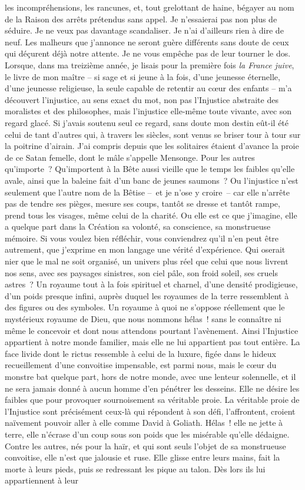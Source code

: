 \documentclass[french,twoside]{book} %
\begin{document}
les incompréhensions, les rancunes, et, tout grelottant de haine, bégayer au nom de la Raison des arrêts prétendus sans appel. Je n’essaierai pas non plus de séduire. Je ne veux pas davantage scandaliser. Je n’ai d’ailleurs rien à dire de neuf. Les malheurs que j’annonce ne seront guère différents sans doute de ceux qui déçurent déjà notre attente. Je ne vous empêche pas de leur tourner le dos. Lorsque, dans ma treizième année, je lisais pour la première fois \emph{la France juive}, le livre de mon maître – si sage et si jeune à la fois, d’une jeunesse éternelle, d’une jeunesse religieuse, la seule capable de retentir au cœur des enfants – m’a découvert l’injustice, au sens exact du mot, non pas l’Injustice abstraite des moralistes et des philosophes, mais l’injustice elle-même toute vivante, avec son regard glacé. Si j’avais soutenu seul ce regard, sans doute mon destin eût-il été celui de tant d’autres qui, à travers les siècles, sont venus se briser tour à tour sur la poitrine d’airain. J’ai compris depuis que les solitaires étaient d’avance la proie de ce Satan femelle, dont le mâle s’appelle Mensonge. Pour les autres qu’importe ? Qu’importent à la Bête aussi vieille que le temps les faibles qu’elle avale, ainsi que la baleine fait d’un banc de jeunes saumons ? Ou l’injustice n’est seulement que l’autre nom de la Bêtise – et je n’ose y croire – car elle n’arrête pas de tendre ses pièges, mesure ses coups, tantôt se dresse et tantôt rampe, prend tous les visages, même celui de la charité. Ou elle est ce que j’imagine, elle a quelque part dans la Création sa volonté, sa conscience, sa monstrueuse mémoire. Si vous voulez bien réfléchir, vous conviendrez qu’il n’en peut être autrement, que j’exprime en mon langage une vérité d’expérience. Qui oserait nier que le mal ne soit organisé, un univers plus réel que celui que nous livrent nos sens, avec ses paysages sinistres, son ciel pâle, son froid soleil, ses cruels astres ? Un royaume tout à la fois spirituel et charnel, d’une densité prodigieuse, d’un poids presque infini, auprès duquel les royaumes de la terre ressemblent à des figures ou des symboles. Un royaume à quoi ne s’oppose réellement que le mystérieux royaume de Dieu, que nous nommons hélas ! sans le connaître ni même le concevoir et dont nous attendons pourtant l’avènement. Ainsi l’Injustice appartient à notre monde familier, mais elle ne lui appartient pas tout entière. La face livide dont le rictus ressemble à celui de la luxure, figée dans le hideux recueillement d’une convoitise impensable, est parmi nous, mais le cœur du monstre bat quelque part, hors de notre monde, avec une lenteur solennelle, et il ne sera jamais donné à aucun homme d’en pénétrer les desseins. Elle ne désire les faibles que pour provoquer sournoisement sa véritable proie. La véritable proie de l’Injustice sont précisément ceux-là qui répondent à son défi, l’affrontent, croient naïvement pouvoir aller à elle comme David à Goliath. Hélas ! elle ne jette à terre, elle n’écrase d’un coup sous son poids que les misérable qu’elle dédaigne. Contre les autres, nés pour la haïr, et qui sont seuls l’objet de sa monstrueuse convoitise, elle n’est que jalousie et ruse. Elle glisse entre leurs mains, fait la morte à leurs pieds, puis se redressant les pique au talon. Dès lors ils lui appartiennent à leur 
\end{document}

